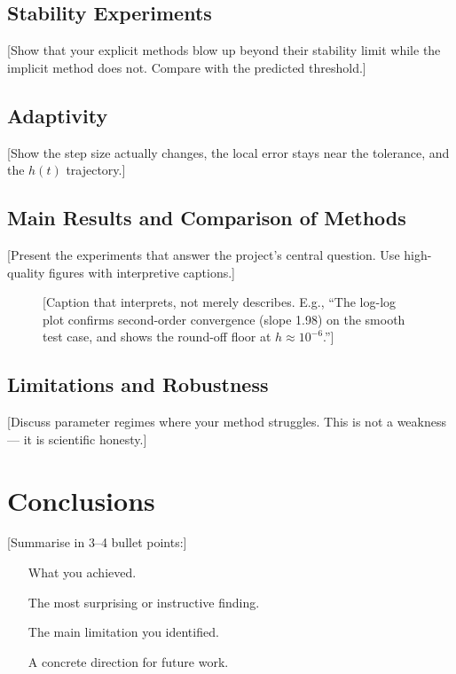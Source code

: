 \documentclass[11pt,a4paper]{article}
\theoremstyle{definition}
\theoremstyle{remark}
\begin{document}
\subsection{Stability Experiments}
[Show that your explicit methods blow up beyond their stability limit while the
implicit method does not. Compare with the predicted threshold.]

\subsection{Adaptivity}
[Show the step size actually changes, the local error stays near the tolerance,
and the $h(t)$ trajectory.]

\subsection{Main Results and Comparison of Methods}
[Present the experiments that answer the project's central question. Use
high-quality figures with interpretive captions.]

\begin{figure}[H]
\centering
{}
\caption{[Caption that interprets, not merely describes. E.g., ``The log-log plot
confirms second-order convergence (slope 1.98) on the smooth test case, and shows
the round-off floor at $h \approx 10^{-6}$.'']}
\label{fig:convergence}
\end{figure}

\subsection{Limitations and Robustness}
[Discuss parameter regimes where your method struggles. This is not a weakness ---
it is scientific honesty.]

\newpage
\section{Conclusions}

[Summarise in 3--4 bullet points:]
\begin{itemize}[leftmargin=2em]
\item [What you achieved.]
\item [The most surprising or instructive finding.]
\item [The main limitation you identified.]
\item [A concrete direction for future work.]
\end{itemize}
\end{document}
